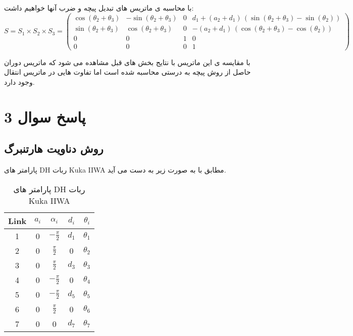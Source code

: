  با محاسبه ی ماتریس های تبدیل پیچه و ضرب آنها خواهیم داشت:
 \[
 S = S_1 \times S_2 \times S_3 = 
 \left(\begin{array}{cccc}
 	\cos \left(\theta_2 +\theta_3 \right) & -\sin \left(\theta_2 +\theta_3 \right) & 0 & d_1 +{\left(a_2 +d_1 \right)}\,{\left(\sin \left(\theta_2 +\theta_3 \right)-\sin \left(\theta_2 \right)\right)}\\
 	\sin \left(\theta_2 +\theta_3 \right) & \cos \left(\theta_2 +\theta_3 \right) & 0 & -{\left(a_2 +d_1 \right)}\,{\left(\cos \left(\theta_2 +\theta_3 \right)-\cos \left(\theta_2 \right)\right)}\\
 	0 & 0 & 1 & 0\\
 	0 & 0 & 0 & 1
 \end{array}\right)
 \]
 
 با مقایسه ی این ماتریس با نتایج بخش های قبل مشاهده می شود که ماتریس دوران حاصل از روش پیچه به درستی محاسبه شده است اما تفاوت هایی در ماتریس انتقال وجود دارد.

 
\section{ پاسخ سوال 3}
\subsection{روش دناویت هارتنبرگ}

پارامتر های DH ربات Kuka IIWA مطابق با 
\cite{slim2023inverse}
به صورت زیر به دست می آید.
\begin{table}[h!]
	\centering
	\renewcommand{\arraystretch}{1.5}
	\begin{tabular}{|c|c|c|c|c|}
		\hline
		Link & \( a_i \) & \( \alpha_i \) & \( d_i \) & \( \theta_i \) \\ \hline
		1 & 0 & \( -\frac{\pi}{2} \) & \( d_1 \) & \( \theta_1 \) \\ \hline
		2 & 0 & \( \frac{\pi}{2} \) & 0 & \( \theta_2 \) \\ \hline
		3 & 0 & \( \frac{\pi}{2} \) & \( d_3 \) & \( \theta_3 \) \\ \hline
		4 & 0 & \( -\frac{\pi}{2} \) & 0 & \( \theta_4 \) \\ \hline
		5 & 0 & \( -\frac{\pi}{2} \) & \( d_5 \) & \( \theta_5 \) \\ \hline
		6 & 0 & \( \frac{\pi}{2} \) & 0 & \( \theta_6 \) \\ \hline
		7 & 0 & 0 & \( d_7 \) & \( \theta_7 \) \\ \hline
	\end{tabular}
	\caption{پارامتر های DH ربات Kuka IIWA}
\end{table}

